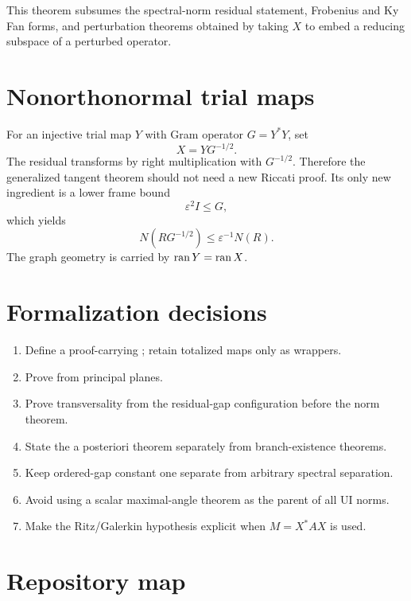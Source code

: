 This theorem subsumes the spectral-norm residual statement, Frobenius and Ky Fan forms, and perturbation theorems obtained by taking $X$ to embed a reducing subspace of a perturbed operator.

\section{Nonorthonormal trial maps}

For an injective trial map $Y$ with Gram operator $G=Y^*Y$, set
\[
  X=YG^{-1/2}.
\]
The residual transforms by right multiplication with $G^{-1/2}$. Therefore the generalized tangent theorem should not need a new Riccati proof. Its only new ingredient is a lower frame bound
\[
  \varepsilon^2I\le G,
\]
which yields
\[
  N(RG^{-1/2})\le \varepsilon^{-1}N(R).
\]
The graph geometry is carried by $\operatorname{ran} Y=\operatorname{ran} X$.

\section{Formalization decisions}

\begin{enumerate}
\item Define a proof-carrying ; retain totalized maps only as wrappers.
\item Prove  from principal planes.
\item Prove transversality from the residual-gap configuration before the norm theorem.
\item State the a posteriori theorem separately from branch-existence theorems.
\item Keep ordered-gap constant one separate from arbitrary spectral separation.
\item Avoid using a scalar maximal-angle theorem as the parent of all UI norms.
\item Make the Ritz/Galerkin hypothesis explicit when $M=X^*AX$ is used.
\end{enumerate}

\section{Repository map}


